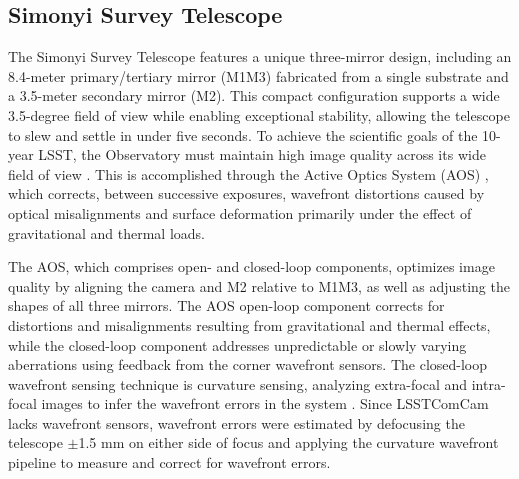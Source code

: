 
\subsection{Simonyi Survey Telescope
\label{ssec:simonyi}}
The Simonyi Survey Telescope \citep{2024SPIE13094E..09S} features a unique three-mirror design, including an 8.4-meter primary/tertiary mirror (M1M3) fabricated from a single substrate and a 3.5-meter secondary mirror (M2).
This compact configuration supports a wide 3.5-degree field of view while enabling exceptional stability, allowing the telescope to slew and settle in under five seconds.
To achieve the scientific goals of the 10-year LSST, the Observatory must maintain high image quality across its wide field of view \citep{2008arXiv0805.2366I}. 
This is accomplished through the Active Optics System (AOS) \citep{2015ApOpt..54.9045X,2024SPIE13094E..3NM}, which corrects, between successive exposures, wavefront distortions caused by optical misalignments and surface deformation primarily under the effect of gravitational and thermal loads. 

The AOS, which comprises open- and closed-loop components, optimizes image quality by aligning the camera and M2 relative to M1M3, as well as adjusting the shapes of all three mirrors. 
The AOS open-loop component corrects for distortions and misalignments resulting from gravitational and thermal effects, while the closed-loop component addresses unpredictable or slowly varying aberrations using feedback from the corner wavefront sensors. 
The closed-loop wavefront sensing technique is curvature sensing, analyzing extra-focal and intra-focal images to infer the wavefront errors in the system \citep{2023aoel.confE..67T}. 
Since LSSTComCam lacks wavefront sensors, wavefront errors were estimated by defocusing the telescope $\pm$1.5 mm on either side of focus and applying the curvature wavefront pipeline to measure and correct for wavefront errors.


